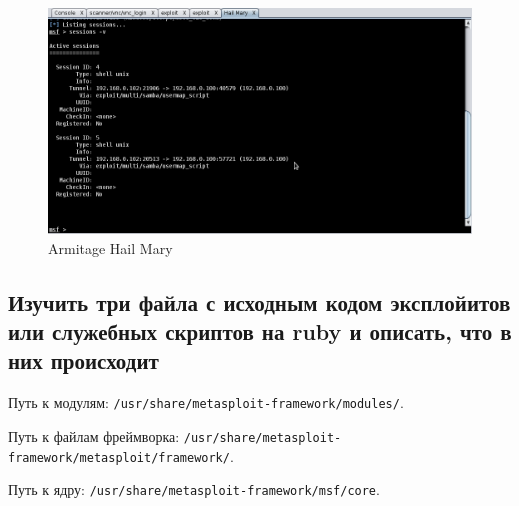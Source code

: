 \documentclass[11pt, a4paper]{article}		%
\begin{document}
\begin{figure}[h!]
\centering
\includegraphics[scale=0.8]{res/meta10}
\caption{Armitage Hail Mary}
\end{figure}




\subsection{Изучить три файла с исходным кодом эксплойитов или служебных скриптов на ruby и описать, что в них происходит}

Путь к модулям: \verb'/usr/share/metasploit-framework/modules/'.

Путь к файлам фреймворка: \verb'/usr/share/metasploit-framework/metasploit/framework/'.

Путь к ядру: \verb'/usr/share/metasploit-framework/msf/core'.
\end{document}
